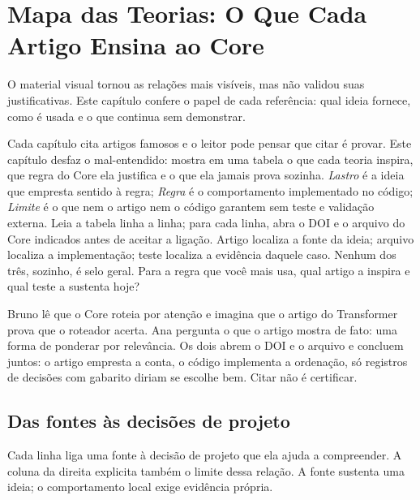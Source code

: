 \chapter{Mapa das Teorias: O Que Cada Artigo Ensina ao Core}

O material visual tornou as relações mais visíveis, mas não validou suas justificativas. Este capítulo confere o papel de cada referência: qual ideia fornece, como é usada e o que continua sem demonstrar.


\roteirodidatico
{Cada capítulo cita artigos famosos e o leitor pode pensar que citar é provar. Este capítulo desfaz o mal-entendido: mostra em uma tabela o que cada teoria inspira, que regra do Core ela justifica e o que ela jamais prova sozinha.}
{\emph{Lastro} é a ideia que empresta sentido à regra; \emph{Regra} é o comportamento implementado no código; \emph{Limite} é o que nem o artigo nem o código garantem sem teste e validação externa.}
{Leia a tabela linha a linha; para cada linha, abra o DOI e o arquivo do Core indicados antes de aceitar a ligação.}
{Artigo localiza a fonte da ideia; arquivo localiza a implementação; teste localiza a evidência daquele caso. Nenhum dos três, sozinho, é selo geral.}
{Para a regra que você mais usa, qual artigo a inspira e qual teste a sustenta hoje?}

{Bruno lê que o Core roteia por atenção e imagina que o artigo do Transformer prova que o roteador acerta. Ana pergunta o que o artigo mostra de fato: uma forma de ponderar por relevância. Os dois abrem o DOI e o arquivo  e concluem juntos: o artigo empresta a conta, o código implementa a ordenação, só registros de decisões com gabarito diriam se escolhe bem. Citar não é certificar.}

\section{Das fontes às decisões de projeto}


\begin{descricao}
Cada linha liga uma fonte à decisão de projeto que ela ajuda a compreender. A coluna da direita explicita também o limite dessa relação. A fonte sustenta uma ideia; o comportamento local exige evidência própria.
\end{descricao}

